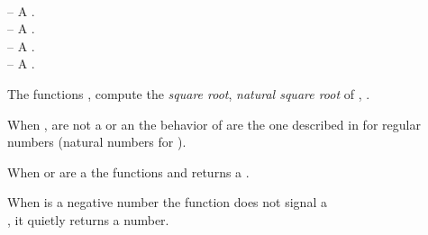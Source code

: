 \documentclass[../Comparisons-Predicates.tex]{subfiles}
\begin{document}

\DSyntax{}

  \RArrow{} \\
  \RArrow{} 

\DArgsNValues{}

 -- A .\\
 -- A .\\
 -- A .\\
 -- A .

\DDescription{}

The functions ,  compute the \emph{square root},
\emph{natural square root} of , .

\noindent
When ,   are not a  or an
 the behavior of   are the one
described in \cite{1996:ANSIHyperSpec} for regular numbers (natural
numbers for ).

\noindent
When  or  are a  the functions
 and  returns a .

\noindent
When  is a negative 
number the function  does not signal a\\
, it quietly returns a
 number.
\end{document}
